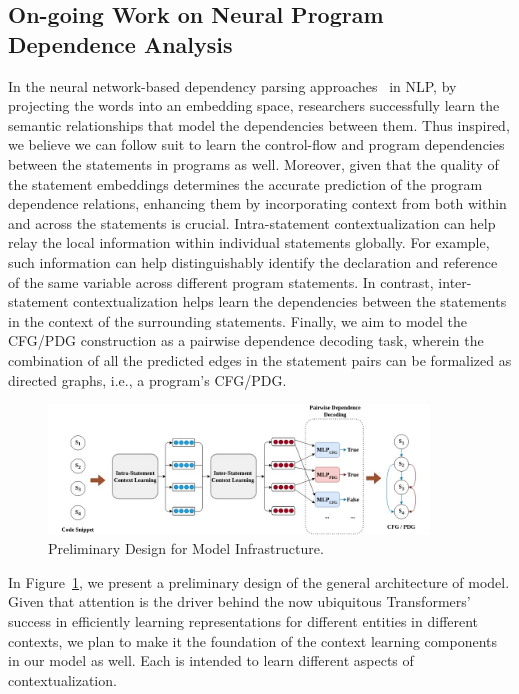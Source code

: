 \subsection{On-going Work on Neural Program Dependence Analysis}
\label{sec:deeppda}

In the neural network-based dependency parsing
approaches~\cite{chen-manning-2014-fast} in NLP, by projecting the
words into an embedding space, researchers successfully learn the
semantic relationships that model the dependencies between them. Thus
inspired, we believe we can follow suit to learn the control-flow and
program dependencies between the statements in programs as
well. Moreover, given that the quality of the statement embeddings
determines the accurate prediction of the program dependence
relations, enhancing them by incorporating context from both within
and across the statements is crucial. Intra-statement
contextualization can help relay the local information within
individual statements globally. For example, such information can help
distinguishably identify the declaration and reference of the same
variable across different program statements. In contrast,
inter-statement contextualization helps learn the dependencies between
the statements in the context of the surrounding statements. Finally,
we aim to model the CFG/PDG construction as a pairwise dependence
decoding task, wherein the combination of all the predicted edges in
the statement pairs can be formalized as directed graphs, i.e., a
program's CFG/PDG.

\begin{figure}[ht]
\begin{center}
    \includegraphics[width=0.9\textwidth]{model-abstract.jpg}
    \caption{Preliminary Design for \tool Model Infrastructure.}
    \label{fig:model}
\end{center}
\end{figure}

In Figure~\ref{fig:model}, we present a preliminary design of the
general architecture of \tool model. Given that attention is the
driver behind the now ubiquitous Transformers’~\cite{Vaswani-2017}
success in efficiently learning representations for different entities
in different contexts, we plan to make it the foundation of the
context learning components in our model as well. Each is intended to
learn different aspects of contextualization.

